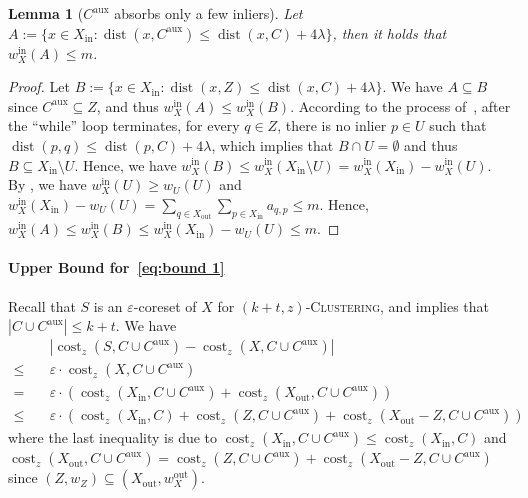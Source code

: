 \documentclass[letterpaper,11pt]{article}
\theoremstyle{plain}
\newtheorem{lemma}[theorem]{Lemma}
\theoremstyle{definition}
\theoremstyle{remark}
\DeclareMathOperator{\cost}{cost}
\DeclareMathOperator{\dist}{dist}
\newcommand{\inl}{\mathrm{in}}
\newcommand{\out}{\mathrm{out}}
\newcommand{\eps}{\varepsilon}
\newcommand{\aux}{\mathrm{aux}}
\newcommand{\ProblemName}[1]{\textsc{#1}}
\newcommand{\tzC}[1]{\ProblemName{$(#1,z)$-Clustering}\xspace}
\begin{document}
\begin{lemma}[$C^\aux$ absorbs only a few inliers]
    \label{claim:for significant}
    Let $A:=\{x\in X_\inl: \dist(x,C^\aux)\le \dist(x,C) + 4\lambda \}$, then it holds that $w_X^\inl(A)\le m$.
\end{lemma}
\begin{proof}
    Let $B:=\{x\in X_\inl:\dist(x,Z)\le \dist(x,C) + 4\lambda\}$. We have $A\subseteq B$ since $C^\aux\subseteq Z$, and thus $w_X^\inl(A)\le w_X^\inl(B)$.
    According to the process of~, after the ``while'' loop terminates, for every $q\in Z$, there is no inlier $p\in U$ such that $\dist(p,q)\le \dist(p,C) + 4\lambda$, which implies that $B\cap U=\emptyset$ and thus $B\subseteq X_\inl\setminus U$.
Hence, we have $w_X^\inl(B)\le w_X^\inl(X_\inl\setminus U) = w_X^\inl(X_\inl) - w_X^\inl(U)$. 
By , we have $w_X^\inl(U)\ge w_U(U)$ and $w_X^\inl(X_\inl) - w_U(U) = \sum_{q\in X_\out}\sum_{p\in X_\inl} a_{q,p}\le m$. Hence, $w_X^\inl(A)\le w_X^\inl(B)\le w_X^\inl(X_\inl) - w_U(U)\le m$.
\end{proof}



\paragraph{Upper Bound for~\eqref{eq:bound 1}} Recall that $S$ is an $\eps$-coreset of $X$ for \tzC{k+t}, and  implies that $|C\cup C^\aux|\le k+t$. We have
\begin{equation}
    \label{eq:cost(S)-cost(X)}
    \begin{aligned}    
    &\quad\left|\cost_z(S,C\cup C^\aux) - \cost_z(X,C\cup C^\aux)\right| \\
    \le&\quad \eps\cdot \cost_z(X,C\cup C^\aux)\\
    =&\quad \eps\cdot\left(\cost_z(X_\inl,C\cup C^\aux) + \cost_z(X_\out,C\cup C^\aux) \right)\\
    \le&\quad \eps\cdot\left(\cost_z(X_\inl,C) + \cost_z(Z,C\cup C^\aux) + \cost_z(X_\out - Z,C\cup C^\aux) \right)
    \end{aligned}
\end{equation}
where the last inequality is due to $\cost_z(X_\inl,C\cup C^\aux)\le \cost_z(X_\inl,C)$ and $\cost_z(X_\out,C\cup C^\aux) = \cost_z(Z, C\cup C^\aux) + \cost_z(X_\out - Z,C\cup C^\aux)$ since $(Z,w_Z)\subseteq (X_\out,w_X^\out)$.
\end{document}
